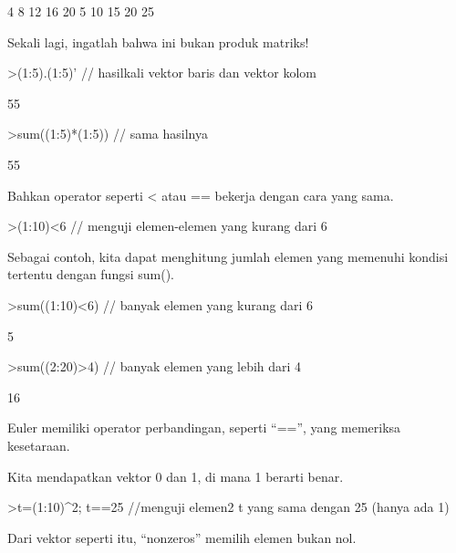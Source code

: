 \documentclass[a4paper,10pt]{article}
\begin{document}
\begin{eulernotebook}
\begin{eulercomment}
\begin{eulercomment}
\begin{eulercomment}
\begin{eulercomment}
\begin{euleroutput}
              4             8            12            16            20 
              5            10            15            20            25 
\end{euleroutput}
\begin{eulercomment}
Sekali lagi, ingatlah bahwa ini bukan produk matriks!
\end{eulercomment}
\begin{eulerprompt}
>(1:5).(1:5)' // hasilkali vektor baris dan vektor kolom
\end{eulerprompt}
\begin{euleroutput}
  55
\end{euleroutput}
\begin{eulerprompt}
>sum((1:5)*(1:5)) // sama hasilnya
\end{eulerprompt}
\begin{euleroutput}
  55
\end{euleroutput}
\begin{eulercomment}
Bahkan operator seperti \textless{} atau == bekerja dengan cara yang sama.
\end{eulercomment}
\begin{eulerprompt}
>(1:10)<6 // menguji elemen-elemen yang kurang dari 6
\end{eulerprompt}
\begin{euleroutput}
  [1,  1,  1,  1,  1,  0,  0,  0,  0,  0]
\end{euleroutput}
\begin{eulercomment}
Sebagai contoh, kita dapat menghitung jumlah elemen yang memenuhi
kondisi tertentu dengan fungsi sum().
\end{eulercomment}
\begin{eulerprompt}
>sum((1:10)<6) // banyak elemen yang kurang dari 6
\end{eulerprompt}
\begin{euleroutput}
  5
\end{euleroutput}
\begin{eulerprompt}
>sum((2:20)>4) // banyak elemen yang lebih dari 4
\end{eulerprompt}
\begin{euleroutput}
  16
\end{euleroutput}
\begin{eulercomment}
Euler memiliki operator perbandingan, seperti “==”, yang memeriksa
kesetaraan.

Kita mendapatkan vektor 0 dan 1, di mana 1 berarti benar.
\end{eulercomment}
\begin{eulerprompt}
>t=(1:10)^2; t==25 //menguji elemen2 t yang sama dengan 25 (hanya ada 1)
\end{eulerprompt}
\begin{euleroutput}
  [0,  0,  0,  0,  1,  0,  0,  0,  0,  0]
\end{euleroutput}
\begin{eulercomment}
Dari vektor seperti itu, “nonzeros” memilih elemen bukan nol.


\end{eulercomment}
\end{eulercomment}
\end{eulercomment}
\end{eulercomment}
\end{eulercomment}
\end{eulernotebook}
\end{document}
